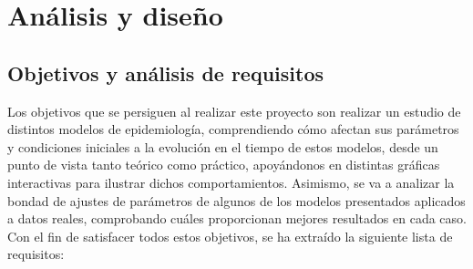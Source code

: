 
\chapter{Análisis y diseño}

\section{Objetivos y análisis de requisitos}

Los objetivos que se persiguen al realizar este proyecto son realizar un estudio de distintos modelos de epidemiología, comprendiendo cómo afectan sus parámetros y condiciones iniciales a la evolución en el tiempo de estos modelos, desde un punto de vista tanto teórico como práctico, apoyándonos en distintas gráficas interactivas para ilustrar dichos comportamientos. Asimismo, se va a analizar la bondad de ajustes de parámetros de algunos de los modelos presentados aplicados a datos reales, comprobando cuáles proporcionan mejores resultados en cada caso. Con el fin de satisfacer todos estos objetivos, se ha extraído la siguiente lista de requisitos:

